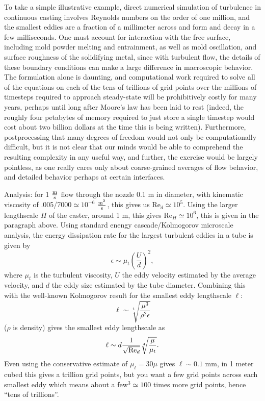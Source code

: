 \documentclass{report}
\begin{document}
To take a simple illustrative example, direct numerical simulation of
turbulence in continuous casting involves Reynolds numbers on the order of one
million, and the smallest eddies are a fraction of a millimeter across and form
and decay in a few milliseconds.  One must account for interaction with the
free surface, including mold powder melting and entrainment, as well as mold
oscillation, and surface roughness of the solidifying metal, since with
turbulent flow, the details of these boundary conditions can make a large
difference in macroscopic behavior.  The formulation alone is daunting, and
computational work required to solve all of the equations on each of the tens
of trillions of grid points over the millions of timesteps required to approach
steady-state will be prohibitively costly for many years, perhaps until long
after Moore's law has been laid to rest (indeed, the roughly four petabytes of
memory required to just store a single timestep would cost about two billion
dollars at the time this is being written).  Furthermore, postprocessing that
many degrees of freedom would not only be computationally difficult, but it is
not clear that our minds would be able to comprehend the resulting complexity
in any useful way, and further, the exercise would be largely pointless, as one
really cares only about coarse-grained averages of flow behavior, and detailed
behavior perhaps at certain interfaces.


Analysis: for 1 $\rm\frac{m}{s}$ flow through the nozzle 0.1 m in diameter,
with kinematic viscosity of .005/7000$\simeq10^{-6}$ $\rm\frac{m^2}{s}$, this
gives us Re$_d\simeq10^5$.  Using the larger lengthscale $H$ of the caster,
around 1 m, this gives Re$_H\simeq10^6$, this is given in the paragraph above.
Using standard enengy cascade/Kolmogorov microscale analysis, the energy
dissipation rate for the largest turbulent eddies in a tube is given by
$$\epsilon\sim\mu_t\left(\frac{U}{d}\right)^2,$$
where $\mu_t$ is the turbulent viscosity, $U$ the eddy velocity estimated by
the average velocity, and $d$ the eddy size estimated by the tube diameter.
Combining this with the well-known Kolmogorov result for the smallest eddy
lengthscale $\ell$:
$$\ell\sim\sqrt[4]{\frac{\mu^3}{\rho^2\epsilon}}$$
($\rho$ is density) gives the smallest eddy lengthscale as
$$\ell\sim d\frac{1}{\sqrt{{\rm Re}_d}}\sqrt[4]{\frac{\mu}{\mu_t}}.$$
Even using the conservative estimate of $\mu_t=30\mu$ gives $\ell\sim0.1$
mm, in 1 meter cubed this gives a trillion grid points, but you want a few
grid points across each smallest eddy which means about a few$^3\simeq100$
times more grid points, hence ``tens of trillions''.
\end{document}
